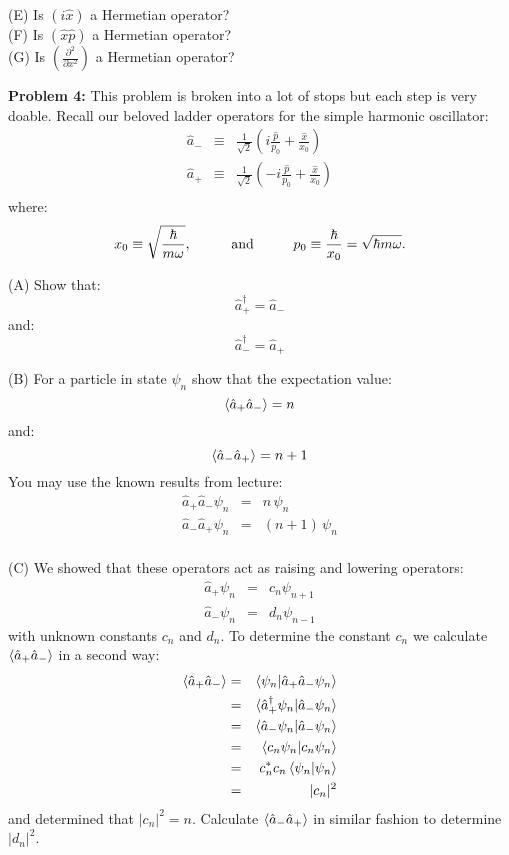\documentclass[12pt]{article}
\begin{document}
\noindent
(E) Is $\left(i\hat{x}\right)$ a Hermetian operator?\\[5pt]

\noindent
(F) Is $\left(\hat{x}\hat{p}\right)$ a Hermetian operator?\\[5pt]

\noindent
(G) Is $\left(\frac{\partial^2}{\partial x^2}\right)$ a Hermetian operator?\\[5pt]

\newpage

\noindent
{\bf Problem 4:}  This problem is broken into a lot of stops but each step is very doable.  Recall our beloved ladder operators for the simple harmonic oscillator:
\begin{eqnarray*}
\hat{a}_- &\equiv& \frac{1}{\sqrt{2}}\left(i \frac{\hat{p}}{p_0} + \frac{\hat{x}}{x_0}\right) \\
\hat{a}_+ &\equiv& \frac{1}{\sqrt{2}}\left(-i \frac{\hat{p}}{p_0} + \frac{\hat{x}}{x_0} \right) \\
\end{eqnarray*}
where:
$$x_0 \equiv \sqrt{\frac{\hbar}{m \omega}}, \hspace{1cm} {\rm and} \hspace{1cm} p_0 \equiv \frac{\hbar}{x_0} = \sqrt{\hbar m \omega}.$$

\noindent
(A) Show that:
$$\hat{a}_+^\dagger = \hat{a}_-$$
and:
$$\hat{a}_-^\dagger = \hat{a}_+$$

\noindent
(B) For a particle in state $\psi_n$ show that the expectation value:
$$\braket{\hat{a}_+\hat{a}_-} = n $$
and:
$$\braket{\hat{a}_-\hat{a}_+} = n+1$$
You may use the known results from lecture:
\begin{eqnarray*}
\hat{a}_+\hat{a}_- \psi_n &=& n \, \psi_{n} \\
\hat{a}_-\hat{a}_+ \psi_n &=& (n+1) \, \psi_{n} \\
\end{eqnarray*}

\noindent
(C) We showed that these operators act as raising and lowering operators:
\begin{eqnarray*}
\hat{a}_+ \psi_n &=& c_n \psi_{n+1} \\
\hat{a}_- \psi_n &=& d_n \psi_{n-1} 
\end{eqnarray*}
with unknown constants $c_n$ and $d_n$.  To determine the constant $c_n$ we calculate $\braket{\hat{a}_+\hat{a}_-}$ in a second way:
\begin{eqnarray*}
\braket{\hat{a}_+\hat{a}_-} &=& \braket{\psi_n | \hat{a}_+ \hat{a}_- \psi_n}\\
 &=& \braket{\hat{a}_+^\dagger \psi_n | \hat{a}_- \psi_n}\\
 &=& \braket{\hat{a}_- \psi_n | \hat{a}_- \psi_n}\\
 &=& \braket{c_n \psi_n | c_n \psi_n}\\
 &=& c_n^* c_n \braket{\psi_n | \psi_n}\\
 &=& |c_n|^2\\ 
\end{eqnarray*}
and determined that $|c_n|^2 = n$.  Calculate 
$\braket{\hat{a}_-\hat{a}_+}$ in similar fashion to determine $|d_n|^2$.\\[5pt]
\end{document}
